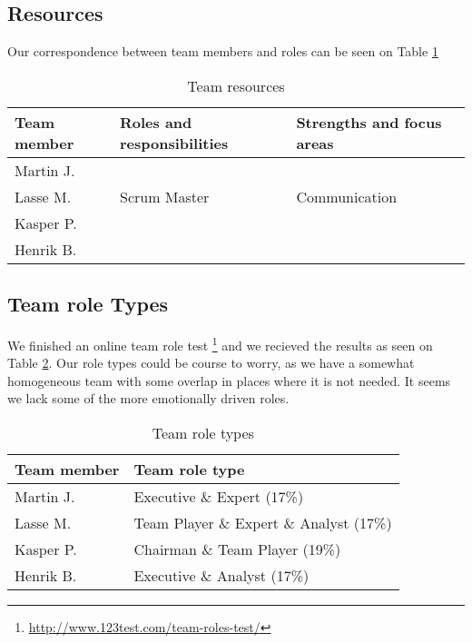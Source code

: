 \subsection{Resources}
Our correspondence between team members and roles can be seen on Table 
\ref{tab:resources}


\begin{table}[!ht]
    \centering
    \begin{tabular}{l|l|l}
        \rowcolor{Gray}
        \textbf{Team member} & \textbf{Roles and responsibilities} & \textbf{Strengths and focus areas}\\\hline
        Martin J.            &&\\
        Lasse M.             & Scrum Master & Communication\\
        Kasper P.            & &\\
        Henrik B.            & &
    \end{tabular}
    \caption{Team resources}
    \label{tab:resources}
\end{table}

\subsection{Team role Types}
We finished an online team role test \footnote{\url{http://www.123test.com/team-roles-test/}} and we recieved the results as seen on 
Table \ref{tab:roleTypes}. Our role types could be course to worry, as we have a somewhat homogeneous team with some overlap in places where
it is not needed. It seems we lack some of the more emotionally driven roles.
\begin{table}[!ht]
    \centering
    \begin{tabular}{l|l}
        \rowcolor{Gray}
        \textbf{Team member} & \textbf{Team role type}\\\hline
        Martin J.            & Executive \& Expert (17\%) \\
        Lasse M.             & Team Player \& Expert \& Analyst (17\%) \\
        Kasper P.            & Chairman \& Team Player (19\%) \\
        Henrik B.            & Executive \& Analyst (17\%)
    \end{tabular}
    \caption{Team role types}
    \label{tab:roleTypes}
\end{table}
